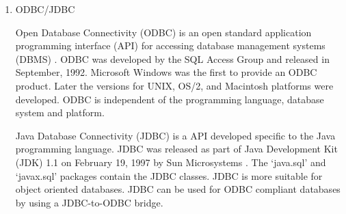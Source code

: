 \begin{enumerate}
\item {} 
ODBC/JDBC

Open Database Connectivity (ODBC) is an open standard application
programming interface (API) for accessing database management
systems (DBMS) \label{\detokenize{i524/technologies:id360}}{\hyperref[\detokenize{i524/technologies:www-odbc}]{\sphinxcrossref{{[}308{]}}}}. ODBC was developed by the SQL
Access Group and released in September, 1992. Microsoft Windows
was the first to provide an ODBC product. Later the versions for
UNIX, OS/2, and Macintosh platforms were developed. ODBC is
independent of the programming language, database system and
platform.

Java Database Connectivity (JDBC) is a API developed specific to
the Java programming language. JDBC was released as part of Java
Development Kit (JDK) 1.1 on February 19, 1997 by Sun
Microsystems \label{\detokenize{i524/technologies:id361}}{\hyperref[\detokenize{i524/technologies:www-jdbc}]{\sphinxcrossref{{[}309{]}}}}. The ‘java.sql’ and ‘javax.sql’
packages contain the JDBC classes. JDBC is more suitable for
object oriented databases. JDBC can be used for ODBC compliant
databases by using a JDBC-to-ODBC bridge.

\end{enumerate}


